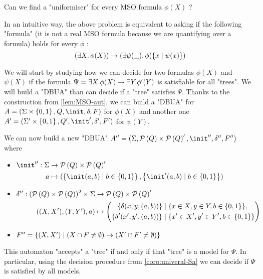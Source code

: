 \documentclass{article}
\begin{document}
\begin{problem}
Can we find a "uniformiser" for every MSO formula $\phi(X)$ ?
\end{problem}


In an intuitive way, the above problem is equivalent to asking if the following "formula" (it is not a real MSO formula
because we are quantifying over a formula) holds for every $\phi$ :
\[ (\exists X.\, \phi(X)) \rightarrow (\exists \psi(\_).\, \phi(\left\{x \mid \psi(x)\right\} ) \]


We will start by studying how we can decide for two formulas $\phi(X)$ and $\psi(X)$ if the formula $\Psi = \exists X. \phi (X) \rightarrow \exists Y. \phi' (Y)$
is satisfiable for all "trees". We will build a "DBUA" than can decide if a "tree" satisfies $\Psi$.
Thanks to the construction from \ref{lem:MSO-aut}, we can build a "DBUA" for $A = (\Sigma \times \set{0,1}, Q, \init, \delta, F)$ for $\phi(X)$
and another one $A' = (\Sigma' \times \set{0,1}, Q', \init', \delta', F')$ for $\psi(Y)$.

We can now build a new "DBUA" $A'' = (\Sigma, \parts Q \times \parts Q', \init'', \delta'', F'')$ where
\begin{itemize}
	\item$\begin{aligned}[t]
			      \init'' : \Sigma & \to      \parts Q \times \parts Q'                                                            \\
			      a                & \mapsto  ( \setdef{ \init(a,b) } {b \in \set{0,1}}, \setdef{ \init'(a,b) } {b \in \set{0,1}})
		      \end{aligned}$

	\item$\begin{aligned}[t]
			      \delta'' : (\mathcal{P}\left(Q\right) \times \mathcal{P}\left(Q\right))^2 \times \Sigma & \to      \mathcal{P}\left(Q\right) \times \mathcal{P}\left(Q\right)'                                                        \\
			      ((X,X'),(Y,Y'),a)                                     & \mapsto \left(\begin{aligned}
					                                                                            \{ \delta(x,y,(a,b)) \}   & \mid  \{x \in X, y \in Y, b \in \left\{0,1\right\}\},    \\
					                                                                            \{ \delta'(x',y',(a,b))\} & \mid  \{x' \in X', y' \in Y', b \in \left\{0,1\right\}\}
				                                                                            \end{aligned}\right)
		      \end{aligned}$

	\item $F'' = \left\{(X,X') \mid (X \cap F \neq \emptyset) \rightarrow (X' \cap F' \neq \emptyset)\right\}$
\end{itemize}
This automaton "accepts" a "tree" if and only if that "tree" is a model for $\Psi$. In particular, using the decision procedure
from \ref{coro:univeral-Sa} we can decide if $\Psi$ is satisfied by all models.







\iffalse
	
	
\fi
\end{document}
